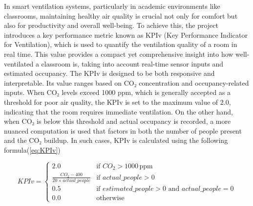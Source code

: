 In smart ventilation systems, particularly in academic environments like classrooms, maintaining healthy air quality is crucial not only for comfort but also for productivity and overall well-being. To achieve this, the project introduces a key performance metric known as KPIv (Key Performance Indicator for Ventilation), which is used to quantify the ventilation quality of a room in real time. This value provides a compact yet comprehensive insight into how well-ventilated a classroom is, taking into account real-time sensor inputs and estimated occupancy. The KPIv is designed to be both responsive and interpretable. Its value ranges based on CO₂ concentration and occupancy-related inputs. When CO₂ levels exceed 1000 ppm, which is generally accepted as a threshold for poor air quality, the KPIv is set to the maximum value of 2.0, indicating that the room requires immediate ventilation. On the other hand, when CO₂ is below this threshold and actual occupancy is recorded, a more nuanced computation is used that factors in both the number of people present and the CO₂ buildup. In such cases, KPIv is calculated using the following formula(\ref{eq:KPIv})

\begin{equation}
KPIv = 
\begin{cases} 
2.0 & \text{if } CO_2 > 1000 \, \text{ppm} \\
\frac{CO_2 - 400}{20 \times actual\_people} & \text{if } actual\_people > 0 \\
0.5 & \text{if } estimated\_people > 0 \text{ and } actual\_people = 0 \\
0.0 & \text{otherwise}
\end{cases}
\label{eq:KPIv}
\end{equation}

